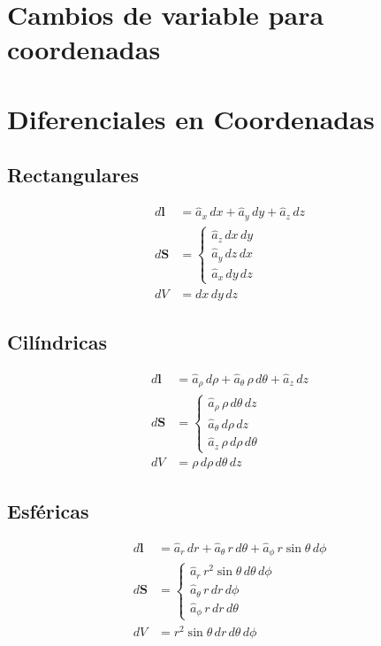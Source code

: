 \documentclass[11pt]{article}
\begin{document}
\newpage

\begin{multicols}{2}

\section{Cambios de variable para coordenadas}

\section{Diferenciales en Coordenadas}

\subsection{Rectangulares}
\begin{align}
    d\mathbf{l} &= \hat{a}_x \, dx + \hat{a}_y \, dy + \hat{a}_z \, dz \\[6pt]
    d\mathbf{S} &= \begin{cases}
        \hat{a}_z \, dx \, dy \\
        \hat{a}_y \, dz \, dx \\
        \hat{a}_x \, dy \, dz
    \end{cases} \\[6pt]
    dV &= dx \, dy \, dz
\end{align}

\subsection{Cilíndricas}
\begin{align}
    d\mathbf{l} &= \hat{a}_\rho \, d\rho + \hat{a}_\theta \, \rho \, d\theta + \hat{a}_z \, dz \\[6pt]
    d\mathbf{S} &= \begin{cases}
        \hat{a}_\rho \, \rho \, d\theta \, dz \\
        \hat{a}_\theta \, d\rho \, dz \\
        \hat{a}_z \, \rho \, d\rho \, d\theta
    \end{cases} \\[6pt]
    dV &= \rho \, d\rho \, d\theta \, dz
\end{align}

\subsection{Esféricas}
\begin{align}
    d\mathbf{l} &= \hat{a}_r \, dr + \hat{a}_\theta \, r \, d\theta + \hat{a}_\phi \, r \sin \theta \, d\phi \\[6pt]
    d\mathbf{S} &= \begin{cases}
        \hat{a}_r \, r^2 \sin\theta \, d\theta \, d\phi \\
        \hat{a}_\theta \, r \, dr \, d\phi \\
        \hat{a}_\phi \, r \, dr \, d\theta
    \end{cases} \\[6pt]
    dV &= r^2 \sin\theta \, dr \, d\theta \, d\phi
\end{align}
\columnbreak


\end{multicols}
\end{document}
